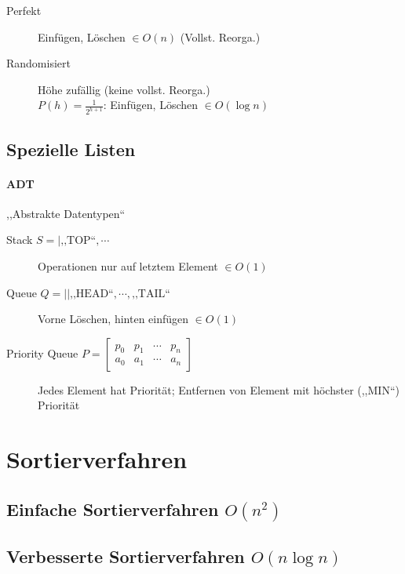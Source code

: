 \begin{description}
  \item [Perfekt]
        Einfügen, Löschen $\in O(n)$ (Vollst. Reorga.)

  \item [Randomisiert]
        Höhe zufällig (keine vollst. Reorga.) \\
        $P(h) = \frac{1}{2^{h + 1}}$: Einfügen, Löschen $\in O(\log n)$
\end{description}

\subsection{Spezielle Listen}

\paragraph{ADT} ,,Abstrakte Datentypen``

\begin{description}
  \item [Stack $S = | \text{,,TOP``}, \cdots$]
        Operationen nur auf letztem Element $\in O(1)$

  \item [Queue $Q = || \text{,,HEAD``}, \cdots, \text{,,TAIL``}$]
        Vorne Löschen, hinten einfügen $\in O(1)$

  \item [Priority Queue $P = \begin{bmatrix}
            p_0 & p_1 & \cdots & p_n \\
            a_0 & a_1 & \cdots & a_n
          \end{bmatrix}$]
        Jedes Element hat Priorität; Entfernen von Element mit höchster (,,MIN``) Priorität
\end{description}

\section{Sortierverfahren}

\subsection{Einfache Sortierverfahren $O(n^2)$}
\subsection{Verbesserte Sortierverfahren $O(n \log n)$}

